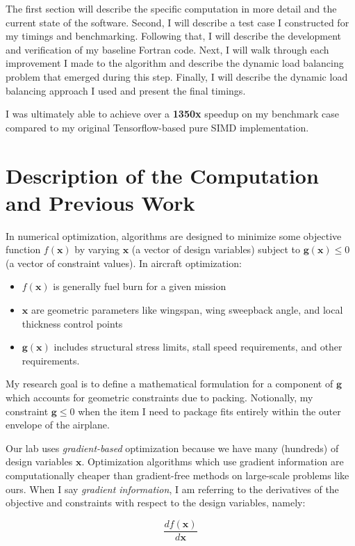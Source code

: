 \documentclass[11pt,letterpaper]{article}
\begin{document}
\qquad The first section will describe the specific computation in more detail and the current state of the software.
Second, I will describe a test case I constructed for my timings and benchmarking.
Following that, I will describe the development and verification of my baseline Fortran code.
Next, I will walk through each improvement I made to the algorithm and describe the dynamic load balancing problem that emerged during this step.
Finally, I will describe the dynamic load balancing approach I used and present the final timings.

\qquad I was ultimately able to achieve over a \textbf{1350x} speedup on my benchmark case compared to my original Tensorflow-based pure SIMD implementation.

\section{Description of the Computation and Previous Work}
In numerical optimization, algorithms are designed to minimize some objective function $f(\textbf{x})$ by varying $\textbf{x}$ (a vector of design variables)
subject to $\textbf{g}(\textbf{x}) \leq 0$ (a vector of constraint values).
In aircraft optimization:
\begin{itemize}
 \item $f(\textbf{x})$ is generally fuel burn for a given mission
 \item $\textbf{x}$ are geometric parameters like wingspan, wing sweepback angle, and local thickness control points
 \item $\textbf{g}(\textbf{x})$ includes structural stress limits, stall speed requirements, and other requirements.
\end{itemize}
My research goal is to define a mathematical formulation for a component of $\textbf{g}$ which accounts for geometric constraints due to packing.
Notionally, my constraint $\textbf{g} \leq 0$ when the item I need to package fits entirely within the outer envelope of the airplane.

\qquad Our lab uses \emph{gradient-based} optimization because we have many (hundreds) of design variables $\textbf{x}$.
Optimization algorithms which use gradient information are computationally cheaper than gradient-free methods on large-scale problems like ours.
When I say \emph{gradient information}, I am referring to the derivatives of the objective and constraints with respect to the design variables, namely:

\begin{equation}
    \frac{df(\textbf{x})}{d\textbf{x}}
\end{equation}
\end{document}
